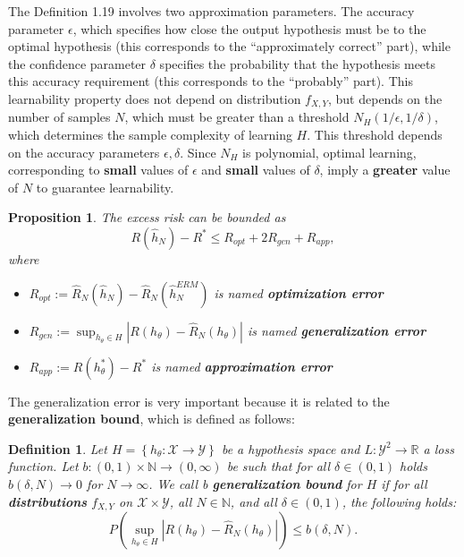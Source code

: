 \documentclass{report}
\newtheorem{definition}{Definition}[chapter]
\newtheorem{proposition}{Proposition}[chapter]
\begin{document}
The Definition 1.19 involves two approximation parameters. The accuracy parameter $\epsilon$, which specifies how close the output hypothesis must be to the optimal hypothesis (this corresponds to the “approximately correct” part), while the confidence parameter $\delta$ specifies the probability that the hypothesis meets this accuracy requirement (this corresponds to the “probably” part). This learnability property does not depend on distribution $f_{X,Y}$, but depends on the number of samples $N$, which must be greater than a threshold $N_H(1/\epsilon,1/\delta)$, which determines the sample complexity of learning $H$. This threshold depends on the accuracy parameters $\epsilon,\delta$. Since $N_H$ is polynomial, optimal learning, corresponding to \textbf{small} values of $\epsilon$ and \textbf{small} values of $\delta$, imply a \textbf{greater} value of $N$ to guarantee learnability.

\begin{proposition}
The excess risk can be bounded as
\begin{equation}
 R(\hat{h}_N)-R^* \leq R_{opt} + 2R_{gen} + R_{app},
\end{equation}
where
\begin{itemize}
\item $R_{opt} := \hat{R}_N(\hat{h}_N)-\hat{R}_N(\hat{h}^{ERM}_N)$ is named \textbf{optimization error}
\item $R_{gen} := \sup_{h_{\theta} \in H}|R(h_\theta)-\hat{R}_N(h_\theta)|$ is named \textbf{generalization error}
\item $R_{app} := R(h^*_\theta)-R^*$ is named \textbf{approximation error}
\end{itemize}
\end{proposition}

The generalization error is very important because it is related to the \textbf{generalization bound}, which is defined as follows:

\begin{definition}
Let $H = \left\{h_\theta : \mathcal{X} \to \mathcal{Y}\right\}$ be a hypothesis space and $L:\mathcal{Y}^2 \to \mathbb{R}$ a loss function. Let $b : (0,1) \times \mathbb{N} \to (0,\infty)$ be such that for all $\delta \in (0,1)$ holds $b(\delta, N) \to 0$ for $N \to \infty$. We call b \textbf{generalization bound} for $H$ if for all \textbf{distributions} $f_{X,Y}$ on $\mathcal{X} \times \mathcal{Y}$, all $N \in \mathbb{N}$, and all $\delta \in (0,1)$, the following holds:
\begin{equation}
  P\left(\sup_{h_{\theta} \in H}|R(h_\theta)-\hat{R}_N(h_\theta)|\right) \leq b(\delta, N).
\end{equation}

\end{definition}
\end{document}
